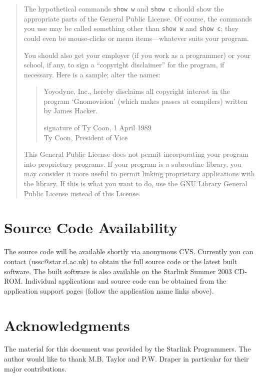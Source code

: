 \documentclass[twoside,11pt]{article}
\newcommand{\htmladdnormallink}[2]{#1}
\newcommand{\xlabel}[1]{}
\renewcommand{\_}{\texttt{\symbol{95}}}
\begin{document}
\begin{quote}
The hypothetical commands {\tt show w} and {\tt show c} should show the
appropriate parts of the General Public License.  Of course, the commands
you use may be called something other than {\tt show w} and {\tt show c};
they could even be mouse-clicks or menu items---whatever suits your
program.

You should also get your employer (if you work as a programmer) or your
school, if any, to sign a ``copyright disclaimer'' for the program, if
necessary.  Here is a sample; alter the names:

\begin{quote}
Yoyodyne, Inc., hereby disclaims all copyright interest in the program
`Gnomovision' (which makes passes at compilers) written by James Hacker.

signature of Ty Coon, 1 April 1989 \\
Ty Coon, President of Vice
\end{quote}


This General Public License does not permit incorporating your program
into proprietary programs.  If your program is a subroutine library, you
may consider it more useful to permit linking proprietary applications
with the library.  If this is what you want to do, use the GNU Library
General Public License instead of this License.
\end{quote}


\section{\label{Source}\xlabel{Source}Source Code Availability}

The source code will be available shortly via anonymous CVS. 
Currently you can contact (\htmladdnormallink{ussc@star.rl.ac.uk}{mailto:ussc@star.rl.ac.uk})
to obtain the full source code 
or the latest built software. The built software is also available on the Starlink
Summer 2003 CD-ROM. Individual applications and source code can be obtained 
from the application support pages (follow the application name links above).

\section{\xlabel{acknowledgments}\label{acknowledgments}Acknowledgments}

The material for this document was provided by the Starlink Programmers. The author 
would like to thank M.B. Taylor and P.W. Draper in particular for their major
contributions.
\end{document}
